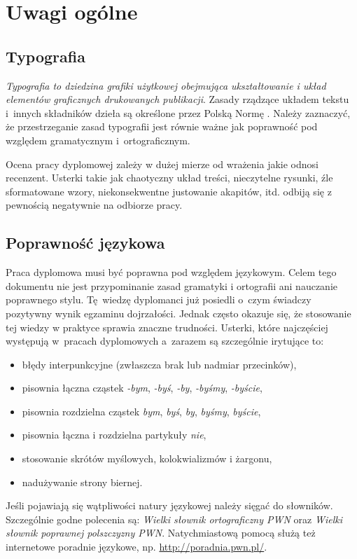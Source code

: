 
\chapter{Uwagi ogólne}
 

\section{Typografia}
\textit{Typografia to dziedzina grafiki użytkowej obejmująca ukształtowanie i układ elementów graficznych drukowanych publikacji}. Zasady rządzące układem tekstu i~innych składników dzieła są określone przez Polską Normę \cite{PN}. Należy zaznaczyć, że przestrzeganie zasad typografii jest równie ważne jak poprawność pod względem gramatycznym i~ortograficznym.

Ocena pracy dyplomowej zależy w dużej mierze od wrażenia jakie odnosi recenzent. Usterki takie jak chaotyczny układ treści, nieczytelne rysunki, źle sformatowane wzory, niekonsekwentne justowanie akapitów, itd.  odbiją się z pewnością negatywnie na odbiorze pracy. 


 

\section{Poprawność językowa}
Praca dyplomowa musi być poprawna pod względem językowym. Celem tego dokumentu nie jest przypominanie zasad gramatyki i ortografii ani nauczanie poprawnego stylu. Tę~wiedzę dyplomanci już posiedli o~czym świadczy pozytywny wynik egzaminu dojrzałości. Jednak często okazuje się, że stosowanie tej wiedzy w praktyce sprawia znaczne trudności. Usterki, które najczęściej występują w~pracach dyplomowych a~zarazem są szczególnie irytujące to:
\begin{itemize}
\item błędy interpunkcyjne (zwłaszcza brak lub nadmiar przecinków),
\item pisownia łączna cząstek \emph{-bym}, \emph{-byś}, \emph{-by}, \emph{-byśmy}, \emph{-byście},
\item pisownia rozdzielna cząstek \emph{bym}, \emph{byś}, \emph{by}, \emph{byśmy}, \emph{byście},
\item pisownia łączna i rozdzielna partykuły \emph{nie}, 
\item stosowanie skrótów myślowych, kolokwializmów i żargonu,
\item nadużywanie strony biernej.
\end{itemize}
Jeśli pojawiają się wątpliwości natury językowej należy sięgać do słowników. Szczególnie godne polecenia są: \emph{Wielki słownik ortograficzny PWN} oraz \emph{Wielki słownik poprawnej polszczyzny PWN}. Natychmiastową pomocą służą też internetowe poradnie językowe, np. \url{http://poradnia.pwn.pl/}. 

